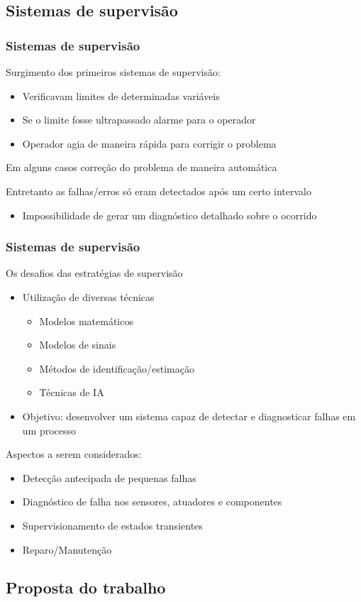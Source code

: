 \documentclass{beamer}
\begin{document}
\subsection{Sistemas de supervisão}
\begin{frame}
    \frametitle{Sistemas de supervisão}

    Surgimento dos primeiros sistemas de supervisão:

\begin{itemize}
    \item Verificavam limites de determinadas variáveis
    \item Se o limite fosse ultrapassado \implica alarme para o operador
    \item Operador agia de maneira rápida para corrigir o problema
\end{itemize}

    Em alguns casos \implica correção do problema de maneira automática

    \vspace{0.25cm}

    Entretanto as falhas/erros só eram detectados após um certo intervalo

\begin{itemize}
    \item Impossibilidade de gerar um diagnóstico detalhado sobre o ocorrido
\end{itemize}

\end{frame}

\begin{frame}
    \frametitle{Sistemas de supervisão}

    Os desafios das estratégias de supervisão

\begin{itemize}
    \item Utilização de diversas técnicas
    \begin{itemize}
        \item Modelos matemáticos
        \item Modelos de sinais
        \item Métodos de identificação/estimação
        \item \alert{Técnicas de IA}
    \end{itemize}
    \item Objetivo: desenvolver um sistema capaz de detectar e diagnosticar
          falhas em um processo
\end{itemize}

Aspectos a serem considerados:

\begin{itemize}
    \item Detecção antecipada de pequenas falhas
    \item Diagnóstico de falha nos sensores, atuadores e componentes
    \item Supervisionamento de estados transientes
    \item Reparo/Manutenção
\end{itemize}
\end{frame}

\subsection{Proposta do trabalho}
\begin{frame}
    \frametitle{}

    
\end{frame}
\end{document}
